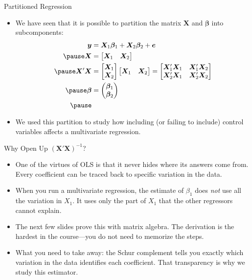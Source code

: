 \documentclass[aspectratio=169, handout, t]{beamer}
\numberwithin{equation}{section}
\begin{document}
\begin{frame}{Partitioned Regression}
\begin{itemize}
\item We have seen that it is possible to partition the matrix $\bm{X}$ and $\bm{\beta}$ into subcomponents:
\begin{align*}
\bm{y}&=\bm{X}_1\bm{\beta}_1 +\bm{X}_2\bm{\beta}_2+\bm{e}\\ \pause
\bm{X}&=\begin{bmatrix}\bm{X}_1& \bm{X}_2 \end{bmatrix}\\\pause
\bm{X}'\bm{X}&=\begin{bmatrix} \bm{X}_1\\ \bm{X}_2 \end{bmatrix} \begin{bmatrix} \bm{X}_1& \bm{X}_2 \end{bmatrix}=\begin{bmatrix} \bm{X}_1'\bm{X}_1& \bm{X}_1'\bm{X}_2\\ \bm{X}_2'\bm{X}_1 &\bm{X}_2'\bm{X}_2 \end{bmatrix}\\ \pause 
\bm{\beta}&=\begin{pmatrix} \bm{\beta}_1 \\ \bm{\beta}_2 \end{pmatrix}\\\pause
\end{align*}
\item We used this partition to study how including (or failing to include) control variables affects a multivariate regression.
\end{itemize}
\end{frame}


\begin{frame}{Why Open Up $(\bm{X'X})^{-1}$?}
\begin{itemize}
\item One of the virtues of OLS is that it never hides where its answers come from. Every coefficient can be traced back to specific variation in the data.\pause
\item When you run a multivariate regression, the estimate of $\beta_1$ does \emph{not} use all the variation in $X_1$. It uses only the part of $X_1$ that the other regressors cannot explain.\pause
\item The next few slides prove this with matrix algebra. The derivation is the hardest in the course---you do not need to memorize the steps.\pause
\item What you need to take away: \alert{the Schur complement tells you exactly which variation in the data identifies each coefficient.} That transparency is why we study this estimator.
\end{itemize}
\end{frame}
\end{document}
